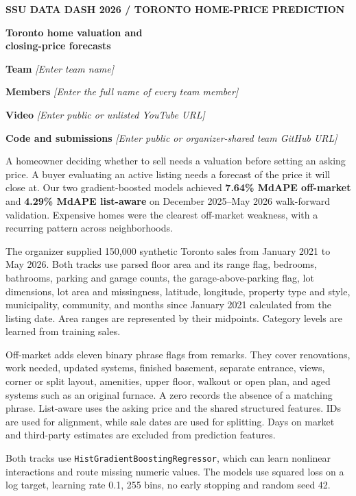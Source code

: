 \documentclass[11pt]{article}
\newcommand{\field}[1]{\textcolor{pending}{\textit{[#1]}}}
\newcommand{\reportsection}[1]{\vspace{6pt}{\large\bfseries\color{navy} #1}\par\vspace{1pt}}
\begin{document}
{\small\bfseries\color{muted} SSU DATA DASH 2026 \quad / \quad TORONTO HOME-PRICE PREDICTION}\par
\vspace{8pt}
{\LARGE\bfseries\color{navy} Toronto home valuation and\\ closing-price forecasts}\par
\vspace{5pt}
\textbf{Team} \field{Enter team name}\par
\textbf{Members} \field{Enter the full name of every team member}\par
\textbf{Video} \field{Enter public or unlisted YouTube URL}\par
\textbf{Code and submissions} \field{Enter public or organizer-shared team GitHub URL}\par

\reportsection{Summary}
A homeowner deciding whether to sell needs a valuation before setting an asking price. A buyer evaluating an active listing needs a forecast of the price it will close at. Our two gradient-boosted models achieved \textbf{7.64\% MdAPE off-market} and \textbf{4.29\% MdAPE list-aware} on December 2025--May 2026 walk-forward validation. Expensive homes were the clearest off-market weakness, with a recurring pattern across neighborhoods.

\reportsection{Data and features}
The organizer supplied 150,000 synthetic Toronto sales from January 2021 to May 2026. Both tracks use parsed floor area and its range flag, bedrooms, bathrooms, parking and garage counts, the garage-above-parking flag, lot dimensions, lot area and missingness, latitude, longitude, property type and style, municipality, community, and months since January 2021 calculated from the listing date. Area ranges are represented by their midpoints. Category levels are learned from training sales.

Off-market adds eleven binary phrase flags from remarks. They cover renovations, work needed, updated systems, finished basement, separate entrance, views, corner or split layout, amenities, upper floor, walkout or open plan, and aged systems such as an original furnace. A zero records the absence of a matching phrase. List-aware uses the asking price and the shared structured features. IDs are used for alignment, while sale dates are used for splitting. Days on market and third-party estimates are excluded from prediction features.

\reportsection{Models}
Both tracks use \texttt{HistGradientBoostingRegressor}, which can learn nonlinear interactions and route missing numeric values. The models use squared loss on a log target, learning rate 0.1, 255 bins, no early stopping and random seed 42.
\end{document}
